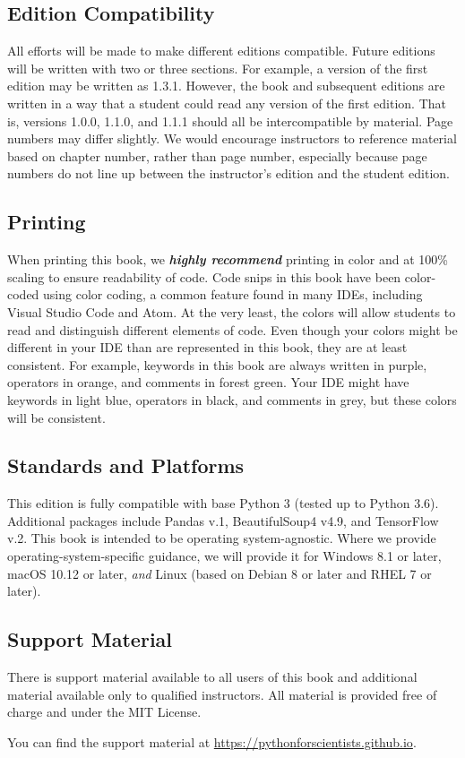 \subsection*{Edition Compatibility}
All efforts will be made to make different editions compatible. Future editions will be written with two or three sections. For example, a version of the first edition may be written as 1.3.1. However, the book and subsequent editions are written in a way that a student could read any version of the first edition. That is, versions 1.0.0, 1.1.0, and 1.1.1 should all be intercompatible by material. Page numbers may differ slightly. We would encourage instructors to reference material based on chapter number, rather than page number, especially because page numbers do not line up between the instructor's edition and the student edition.\par
\subsection*{Printing}
When printing this book, we \textbf{\textit{highly recommend}} printing in color and at 100\% scaling to ensure readability of code. Code snips in this book have been color-coded using color coding, a common feature found in many IDEs, including Visual Studio Code and Atom. At the very least, the colors will allow students to read and distinguish different elements of code. Even though your colors might be different in your IDE than are represented in this book, they are at least consistent. For example, keywords in this book are always written in purple, operators in orange, and comments in forest green. Your IDE might have keywords in light blue, operators in black, and comments in grey, but these colors will be consistent.\par
\subsection*{Standards and Platforms}
This edition is fully compatible with base Python 3 (tested up to Python 3.6). Additional packages include Pandas v.1, BeautifulSoup4 v4.9, and TensorFlow v.2. This book is intended to be operating system-agnostic. Where we provide operating-system-specific guidance, we will provide it for Windows 8.1 or later, macOS 10.12 or later, \textit{and} Linux (based on Debian 8 or later and RHEL 7 or later).
\subsection*{Support Material}
There is support material available to all users of this book and additional material available only to qualified instructors. All material is provided free of charge and under the MIT License.\par
You can find the support material at \href{https://pythonforscientists.github.io}{https://pythonforscientists.github.io}.
